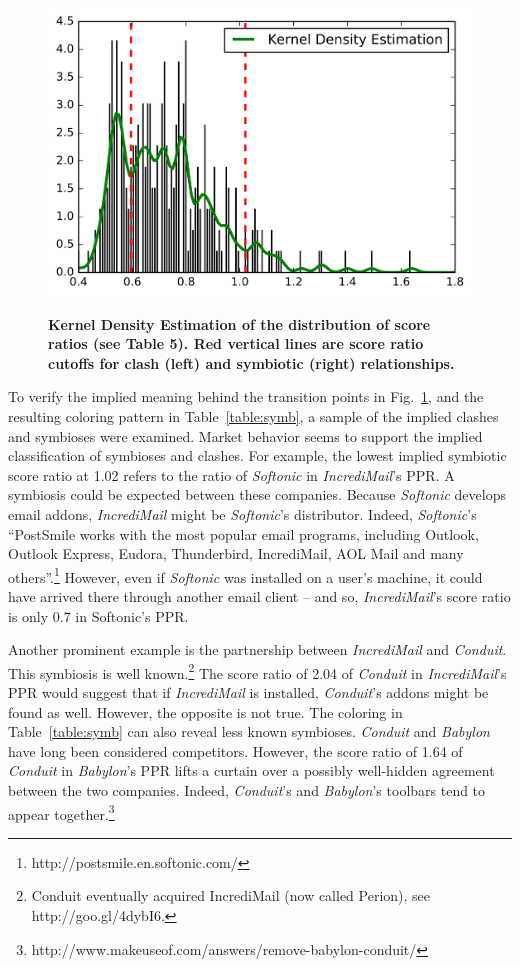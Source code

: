 \documentclass[10pt,letterpaper]{article}
\begin{document}
\begin{figure}[!h]
\caption{{\bf Kernel Density Estimation of the distribution of score ratios (see Table 5). Red vertical lines are score ratio cutoffs for clash (left) and symbiotic (right) relationships.}}
\includegraphics[width=0.8\linewidth]{figures/KDE.png}
\label{fig:kde}
\end{figure}

To verify the implied meaning behind the transition points in Fig.~\ref{fig:kde}, and the resulting coloring pattern in Table~\ref{table:symb}, a sample of the implied clashes and symbioses were examined. Market behavior seems to support the implied classification of symbioses and clashes. For example, the lowest implied symbiotic score ratio at 1.02 refers to the ratio of \textit{Softonic} in \textit{IncrediMail}'s PPR. A symbiosis could be expected between these companies. Because \textit{Softonic} develops email addons, \textit{IncrediMail} might be \textit{Softonic}'s distributor. Indeed, \textit{Softonic}'s ``PostSmile works with the most popular email programs, including Outlook, Outlook Express, Eudora, Thunderbird, IncrediMail, AOL Mail and many others''.\footnote{ http://postsmile.en.softonic.com/} However, even if \textit{Softonic }was installed on a user's machine, it could have arrived there through another email client -- and so, \textit{IncrediMail}'s score ratio is only 0.7 in Softonic's PPR. 

Another prominent example is the partnership between \textit{IncrediMail} and \textit{Conduit}. This symbiosis is well known.\footnote{ Conduit eventually acquired IncrediMail (now called Perion), see http://goo.gl/4dybI6.} The score ratio of 2.04 of \textit{Conduit} in \textit{IncrediMail}'s PPR would suggest that if \textit{IncrediMail} is installed, \textit{Conduit}'s addons might be found as well. However, the opposite is not true. The coloring in Table~\ref{table:symb} can also reveal less known symbioses. \textit{Conduit} and \textit{Babylon} have long been considered competitors. However, the score ratio of 1.64 of \textit{Conduit} in \textit{Babylon}'s PPR lifts a curtain over a possibly well-hidden agreement between the two companies. Indeed, \textit{Conduit}'s and \textit{Babylon}'s toolbars tend to appear together.\footnote{ http://www.makeuseof.com/answers/remove-babylon-conduit/}
\end{document}
